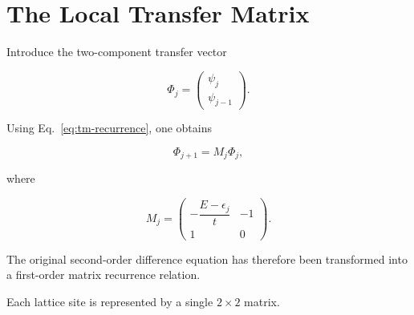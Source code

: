 
\section{The Local Transfer Matrix}

Introduce the two-component transfer vector

\begin{equation}
	\Phi_j
	=
	\begin{pmatrix}
		\psi_j \\
		\psi_{j-1}
	\end{pmatrix}.
	\label{eq:state-vector}
\end{equation}

Using Eq.~\eqref{eq:tm-recurrence}, one obtains

\begin{equation}
	\Phi_{j+1}
	=
	M_j
	\Phi_j,
	\label{eq:local-transfer}
\end{equation}

where

\begin{equation}
	M_j
	=
	\begin{pmatrix}
		-\dfrac{E-\epsilon_j}{t}
		 &
		-1
		\\[1ex]
		1
		 &
		0
	\end{pmatrix}.
	\label{eq:local-transfer-matrix}
\end{equation}

The original second-order difference equation has therefore been
transformed into a first-order matrix recurrence relation.

Each lattice site is represented by a single $2\times2$ matrix.

\begin{center}
\end{center}

